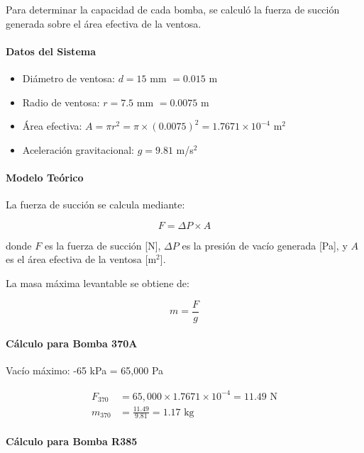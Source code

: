 Para determinar la capacidad de cada bomba, se calculó la fuerza de succión generada sobre el área efectiva de la ventosa.

\paragraph{Datos del Sistema}

\begin{itemize}
    \item Diámetro de ventosa: $d = 15$ mm $= 0.015$ m
    \item Radio de ventosa: $r = 7.5$ mm $= 0.0075$ m
    \item Área efectiva: $A = \pi r^{2} = \pi \times (0.0075)^{2} = 1.7671 \times 10^{-4}$ m$^{2}$
    \item Aceleración gravitacional: $g = 9.81$ m/s$^{2}$
\end{itemize}

\paragraph{Modelo Teórico}

La fuerza de succión se calcula mediante:

\begin{equation}
F = \Delta P \times A
\end{equation}

donde $F$ es la fuerza de succión [N], $\Delta P$ es la presión de vacío generada [Pa], y $A$ es el área efectiva de la ventosa [m$^{2}$].

La masa máxima levantable se obtiene de:

\begin{equation}
m = \frac{F}{g}
\end{equation}

\paragraph{Cálculo para Bomba 370A}

Vacío máximo: -65 kPa = 65,000 Pa

\begin{align}
F_{370} &= 65{,}000 \times 1.7671 \times 10^{-4} = 11.49 \text{ N} \\
m_{370} &= \frac{11.49}{9.81} = 1.17 \text{ kg}
\end{align}

\paragraph{Cálculo para Bomba R385}

